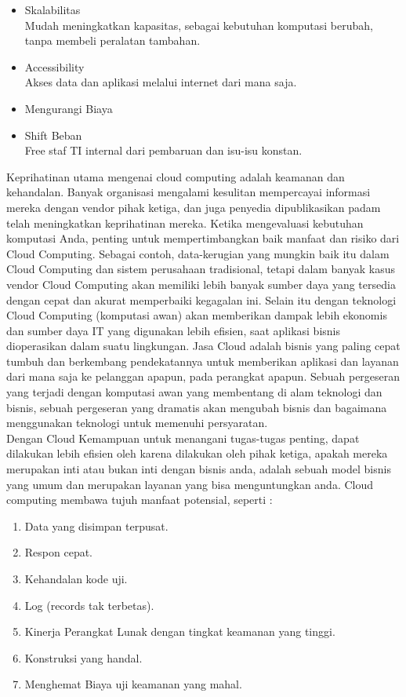 \begin{itemize}
\item Skalabilitas \\Mudah meningkatkan kapasitas, sebagai kebutuhan komputasi berubah, tanpa membeli peralatan tambahan.
\item Accessibility \\Akses data dan aplikasi melalui internet dari mana saja.
\item Mengurangi Biaya
\item Shift Beban \\Free staf TI internal dari pembaruan dan isu-isu konstan.
\end{itemize}
\tab Keprihatinan utama mengenai cloud computing adalah keamanan dan kehandalan. Banyak organisasi mengalami kesulitan mempercayai informasi mereka dengan vendor pihak ketiga, dan juga penyedia dipublikasikan padam telah meningkatkan keprihatinan mereka. Ketika mengevaluasi kebutuhan komputasi Anda, penting untuk mempertimbangkan baik manfaat dan risiko dari Cloud Computing. Sebagai contoh, data-kerugian yang mungkin baik itu dalam Cloud Computing dan sistem perusahaan tradisional, tetapi dalam banyak kasus vendor Cloud Computing akan memiliki lebih banyak sumber daya yang tersedia dengan cepat dan akurat memperbaiki kegagalan ini. Selain itu dengan teknologi Cloud Computing (komputasi awan) akan memberikan dampak lebih ekonomis dan sumber daya IT yang digunakan lebih efisien, saat aplikasi bisnis dioperasikan dalam suatu lingkungan. Jasa Cloud adalah bisnis yang paling cepat tumbuh dan berkembang pendekatannya untuk memberikan aplikasi dan layanan dari mana saja ke pelanggan apapun, pada perangkat apapun. Sebuah pergeseran yang terjadi dengan komputasi awan yang membentang di alam teknologi dan bisnis, sebuah pergeseran yang dramatis akan mengubah bisnis dan bagaimana menggunakan teknologi untuk memenuhi persyaratan. \\Dengan Cloud Kemampuan untuk menangani tugas-tugas penting, dapat dilakukan
lebih efisien oleh karena dilakukan oleh pihak ketiga, apakah mereka merupakan inti atau bukan inti dengan bisnis anda, adalah sebuah model bisnis yang umum dan merupakan layanan yang bisa menguntungkan anda.
Cloud computing membawa tujuh manfaat potensial, seperti :
\begin{enumerate}
\item Data yang disimpan terpusat.
\item Respon cepat.
\item Kehandalan kode uji.
\item Log (records tak terbetas).
\item Kinerja Perangkat Lunak dengan tingkat keamanan yang tinggi.
\item Konstruksi yang handal.
\item Menghemat Biaya uji keamanan yang mahal.
\end{enumerate}
